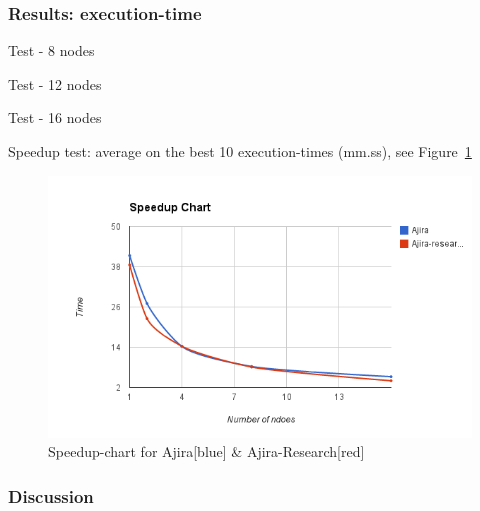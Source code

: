 % 
\subsubsection{Results: execution-time}

Test - 8 nodes
\newline \newline
\renewcommand{\arraystretch}{1.2}
{\footnotesize\tt

}

\newpage

Test - 12 nodes
\newline \newline
\renewcommand{\arraystretch}{1.2}
{\footnotesize\tt

}

Test - 16 nodes
\newline \newline
\renewcommand{\arraystretch}{1.2}
{\footnotesize\tt

}

\newpage

Speedup test: average on the best 10 execution-times (mm.ss), see Figure~\ref{fig:speedup}
\newline \newline
\renewcommand{\arraystretch}{1.2}
{\footnotesize\tt

}

\begin{figure}
\centering
\includegraphics[scale=0.6]{speedup}
\caption{Speedup-chart for Ajira[blue] \& Ajira-Research[red]}
\label{fig:speedup}
\end{figure}

% 
\subsubsection*{Discussion}

